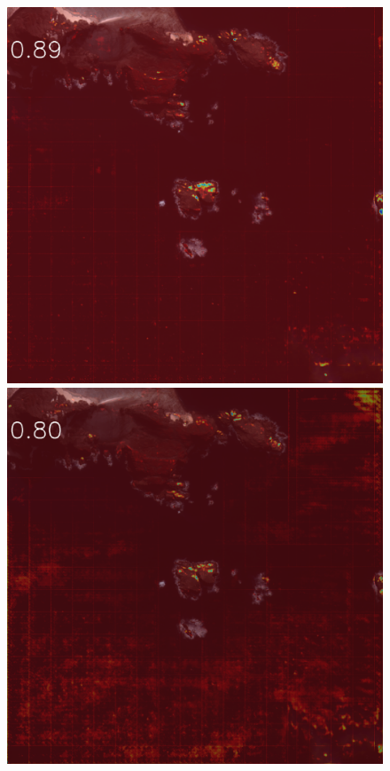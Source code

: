 \documentclass[runningheads]{llncs}
\begin{document}
\begin{figure}[h]
\includegraphics[width=\subFigx]{./fig/datagrow/MSE_single_unet_train_0_3.txt_bias-1_bs128_do0.1e25/orthoWV02_11FEB251253222-M1BS-1030010009092C00_u08rfAEAC.png}
\includegraphics[width=\subFigx]{./fig/datagrow/MSE_single_unet_train_0_4.txt_bias-1_bs128_do0.1e25/orthoWV02_11FEB251253222-M1BS-1030010009092C00_u08rfAEAC.png}



\end{figure}
\end{document}
